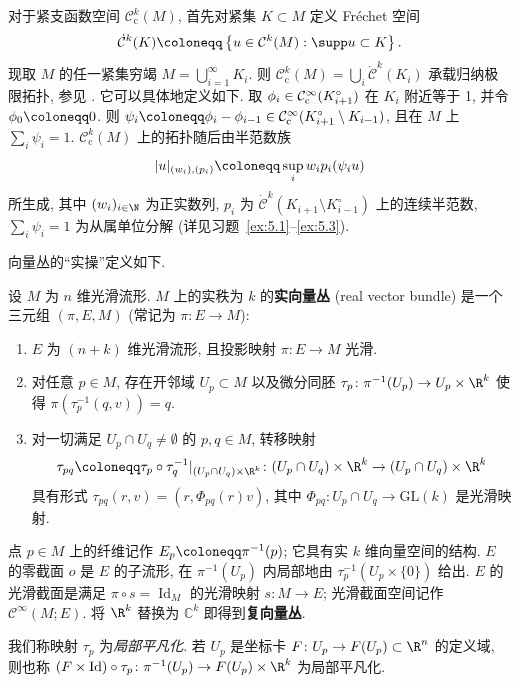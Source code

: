 对于紧支函数空间 $\mathcal{C}_{\mathrm{c}}^k(M)$, 首先对紧集 $K \subset M$ 定义 Fréchet 空间
\begin{equation}\label{eq:5.18}
    \dot{\mathcal{C}}^k(K) \defeq \left\{ u \in \mathcal{C}^k(M) : \supp u \subset K \right\}.
\end{equation}
现取 $M$ 的任一紧集穷竭 $M = \bigcup_{i=1}^\infty K_i$. 则 $\mathcal{C}_{\mathrm{c}}^k(M) = \bigcup_i \dot{\mathcal{C}}^k(K_i)$ 承载归纳极限拓扑, 参见 \cite[第~V.4~章]{RS72}. 它可以具体地定义如下. 取 $\phi_i \in \mathcal{C}_{\mathrm{c}}^\infty(K_{i+1}^\circ)$ 在 $K_i$ 附近等于 1, 并令 $\phi_0 \defeq 0$. 则 $\psi_i \defeq \phi_i - \phi_{i-1} \in \SmoothComp(K_{i+1}^\circ \setminus K_{i-1})$, 且在 $M$ 上 $\sum_i \psi_i = 1$. $\mathcal{C}_{\mathrm{c}}^k(M)$ 上的拓扑随后由半范数族
\begin{equation}\label{eq:5.19}
    |u|_{(w_i), (p_i)} \defeq \sup_{i} w_i p_i(\psi_i u)
\end{equation}
所生成, 其中 $(w_i)_{i \in \N}$ 为正实数列, $p_i$ 为 $\dot{\mathcal{C}}^k(K_{i+1} \setminus K_{i-1}^\circ)$ 上的连续半范数, $\sum_i \psi_i = 1$ 为从属单位分解 (详见习题~\ref{ex:5.1}--\ref{ex:5.3}).

向量丛的``实操''定义如下.

\begin{definition}[向量丛]\label{def:5.5}
设 $M$ 为 $n$ 维光滑流形. $M$ 上的实秩为 $k$ 的\textbf{实向量丛} (real vector bundle) 是一个三元组 $(\pi, E, M)$ (常记为 $\pi \colon E \to M$):
\begin{enumerate}
    \item $E$ 为 $(n+k)$ 维光滑流形, 且投影映射 $\pi \colon E \to M$ 光滑.
    \item 对任意 $p \in M$, 存在开邻域 $U_p \subset M$ 以及微分同胚 $\tau_p \colon \pi^{-1}(U_p) \to U_p \times \R^k$ 使得 $\pi(\tau_p^{-1}(q, v)) = q$.
    \item 对一切满足 $U_p \cap U_q \neq \emptyset$ 的 $p, q \in M$, 转移映射
    \begin{equation}\label{eq:5.20}
        \tau_{pq} \defeq \tau_p \circ \tau_q^{-1}|_{(U_p \cap U_q) \times \R^k} \colon (U_p \cap U_q) \times \R^k \to (U_p \cap U_q) \times \R^k
    \end{equation}
    具有形式 $\tau_{pq}(r, v) = (r, \Phi_{pq}(r) v)$, 其中 $\Phi_{pq} \colon U_p \cap U_q \to \mathrm{GL}(k)$ 是光滑映射.
\end{enumerate}
点 $p \in M$ 上的纤维记作 $E_p \defeq \pi^{-1}(p)$; 它具有实 $k$ 维向量空间的结构. $E$ 的零截面 $o$ 是 $E$ 的子流形, 在 $\pi^{-1}(U_p)$ 内局部地由 $\tau_p^{-1}(U_p \times \{0\})$ 给出. $E$ 的光滑截面是满足 $\pi \circ s = \operatorname{Id}_M$ 的光滑映射 $s \colon M \to E$; 光滑截面空间记作 $\mathcal{C}^\infty(M; E)$. 将 $\R^k$ 替换为 $\mathbb{C}^k$ 即得到\textbf{复向量丛}.

我们称映射 $\tau_p$ 为\emph{局部平凡化}. 若 $U_p$ 是坐标卡 $F \colon U_p \to F(U_p) \subset \R^n$ 的定义域, 则也称 $(F \times \operatorname{Id}) \circ \tau_p \colon \pi^{-1}(U_p) \to F(U_p) \times \R^k$ 为局部平凡化.
\end{definition}

